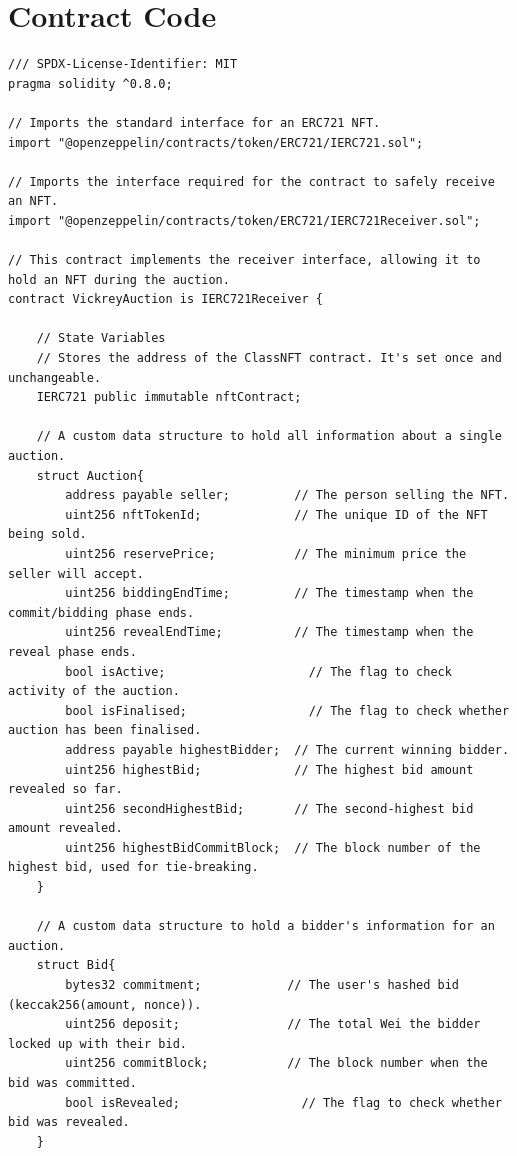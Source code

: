 \documentclass[11pt, a4paper]{article}
\begin{document}
\section{Contract Code}
\begin{lstlisting}
/// SPDX-License-Identifier: MIT
pragma solidity ^0.8.0;

// Imports the standard interface for an ERC721 NFT.
import "@openzeppelin/contracts/token/ERC721/IERC721.sol";

// Imports the interface required for the contract to safely receive an NFT.
import "@openzeppelin/contracts/token/ERC721/IERC721Receiver.sol";

// This contract implements the receiver interface, allowing it to hold an NFT during the auction.
contract VickreyAuction is IERC721Receiver {

    // State Variables
    // Stores the address of the ClassNFT contract. It's set once and unchangeable.
    IERC721 public immutable nftContract;

    // A custom data structure to hold all information about a single auction.
    struct Auction{
        address payable seller;         // The person selling the NFT.
        uint256 nftTokenId;             // The unique ID of the NFT being sold.
        uint256 reservePrice;           // The minimum price the seller will accept.
        uint256 biddingEndTime;         // The timestamp when the commit/bidding phase ends.
        uint256 revealEndTime;          // The timestamp when the reveal phase ends.
        bool isActive;                    // The flag to check activity of the auction.
        bool isFinalised;                 // The flag to check whether auction has been finalised.
        address payable highestBidder;  // The current winning bidder.
        uint256 highestBid;             // The highest bid amount revealed so far.
        uint256 secondHighestBid;       // The second-highest bid amount revealed.
        uint256 highestBidCommitBlock;  // The block number of the highest bid, used for tie-breaking.
    }

    // A custom data structure to hold a bidder's information for an auction.
    struct Bid{
        bytes32 commitment;            // The user's hashed bid (keccak256(amount, nonce)).
        uint256 deposit;               // The total Wei the bidder locked up with their bid.
        uint256 commitBlock;           // The block number when the bid was committed.
        bool isRevealed;                 // The flag to check whether bid was revealed.
    }


\end{lstlisting}
\end{document}

